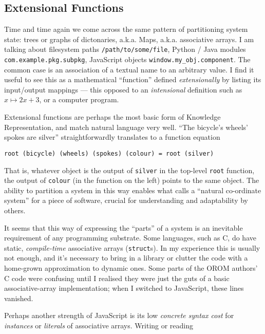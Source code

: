 \hypertarget{extensional-functions}{%
\subsection{Extensional Functions}\label{extensional-functions}}

Time and time again we come across the same pattern of partitioning
system state: trees or graphs of dictonaries, a.k.a. Maps, a.k.a.
associative arrays. I am talking about filesystem paths
\texttt{/path/to/some/file}, Python / Java modules
\texttt{com.example.pkg.subpkg}, JavaScript objects
\texttt{window.my\_obj.component}. The common case is an association of
a textual name to an arbitrary value. I find it useful to see this as a
mathematical ``function'' defined \emph{extensionally} by listing its
input/output mappings --- this opposed to an \emph{intensional}
definition such as \(x \mapsto 2x+3\), or a computer program.

Extensional functions are perhaps the most basic form of Knowledge
Representation, and match natural language very well. ``The bicycle's
wheels' spokes are silver'' straightforwardly translates to a function
equation

\begin{lstlisting}
root (bicycle) (wheels) (spokes) (colour) = root (silver)
\end{lstlisting}

That is, whatever object is the output of \texttt{silver} in the
top-level \texttt{root} function, the output of \texttt{colour} (in the
function on the left) points to the same object. The ability to
partition a system in this way enables what \cite{externalise} calls a
``natural co-ordinate system'' for a piece of software, crucial for
understanding and adaptability by others.

It seems that this way of expressing the ``parts'' of a system is an
inevitable requirement of any programming substrate. Some languages,
such as C, do have static, \emph{compile-time} associative arrays
(\texttt{struct}s). In my experience this is usually not enough, and
it's necessary to bring in a library or clutter the code with a
home-grown approximation to dynamic ones. Some parts of the OROM
authors' C code were confusing until I realised they were just the guts
of a basic associative-array implementation; when I switched to
JavaScript, these lines vanished.

Perhaps another strength of JavaScript is its low \emph{concrete syntax
cost} for \emph{instances} or \emph{literals} of associative arrays.
Writing or reading

